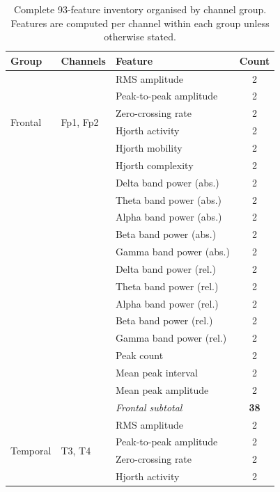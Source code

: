\begin{table}[htbp]
\centering
\caption{Complete 93-feature inventory organised by channel
group. Features are computed per channel within each group
unless otherwise stated.}
\label{tab:feature_inventory}
\renewcommand{\arraystretch}{1.25}
\begin{tabular}{p{1.5cm} p{2.5cm} p{4.0cm} c}
\toprule
\textbf{Group} & \textbf{Channels} & \textbf{Feature} &
\textbf{Count} \\
\midrule
\multirow{6}{*}{Frontal}
 & \multirow{6}{*}{Fp1, Fp2}
 & RMS amplitude                    & 2 \\
 & & Peak-to-peak amplitude         & 2 \\
 & & Zero-crossing rate             & 2 \\
 & & Hjorth activity                & 2 \\
 & & Hjorth mobility                & 2 \\
 & & Hjorth complexity              & 2 \\
 & & Delta band power (abs.)        & 2 \\
 & & Theta band power (abs.)        & 2 \\
 & & Alpha band power (abs.)        & 2 \\
 & & Beta band power (abs.)         & 2 \\
 & & Gamma band power (abs.)        & 2 \\
 & & Delta band power (rel.)        & 2 \\
 & & Theta band power (rel.)        & 2 \\
 & & Alpha band power (rel.)        & 2 \\
 & & Beta band power (rel.)         & 2 \\
 & & Gamma band power (rel.)        & 2 \\
 & & Peak count                     & 2 \\
 & & Mean peak interval             & 2 \\
 & & Mean peak amplitude            & 2 \\
\multirow{1}{*}{}
 & & \textit{Frontal subtotal}      & \textbf{38} \\
\midrule
\multirow{6}{*}{Temporal}
 & \multirow{6}{*}{T3, T4}
 & RMS amplitude                    & 2 \\
 & & Peak-to-peak amplitude         & 2 \\
 & & Zero-crossing rate             & 2 \\
 & & Hjorth activity                & 2 \\

\end{tabular}
\end{table}
